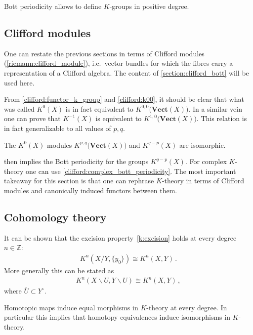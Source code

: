 {    \begin{remark}
        Bott periodicity allows to define $K$-groups in positive degree.
    \end{remark}

\subsection{Clifford modules}

    One can restate the previous sections in terms of Clifford modules (\cref{riemann:clifford_module}), i.e.~vector bundles for which the fibres carry a representation of a Clifford algebra. The content of \cref{section:clifford_bott} will be used here.

    From \cref{clifford:functor_k_group} and \cref{clifford:k00}, it should be clear that what was called $K^0(X)$ is in fact equivalent to $K^{0,0}\bigl(\mathbf{Vect}(X)\bigr)$. In a similar vein one can prove that $K^{-1}(X)$ is equivalent to $K^{1,0}\bigl(\mathbf{Vect}(X)\bigr)$. This relation is in fact generalizable to all values of $p,q$.
    \begin{property}
        The $K^0(X)$-modules $K^{p,q}\bigl(\mathbf{Vect}(X)\bigr)$ and $K^{q-p}(X)$ are isomorphic.
    \end{property}

     then implies the Bott periodicity for the groups $K^{q-p}(X)$. For complex $K$-theory one can use \cref{clifford:complex_bott_periodicity}. The most important takeaway for this section is that one can rephrase $K$-theory in terms of Clifford modules and canonically induced functors between them.

\subsection{Cohomology theory}

    \begin{property}[Excision]
        It can be shown that the excision property~\ref{k:excision} holds at every degree $n\in\mathbb{Z}$:
        \begin{gather}
            K^n(X/Y,\{y_0\})\cong K^n(X,Y)\,.
        \end{gather}
        More generally this can be stated as
        \begin{gather}
            K^n(X\backslash U,Y\backslash U)\cong K^n(X,Y)\,,
        \end{gather}
        where $\overline{U}\subset Y^\circ$.
    \end{property}
    \begin{property}
        Homotopic maps induce equal morphisms in $K$-theory at every degree. In particular this implies that homotopy equivalences induce isomorphisms in $K$-theory.
    \end{property}

}
